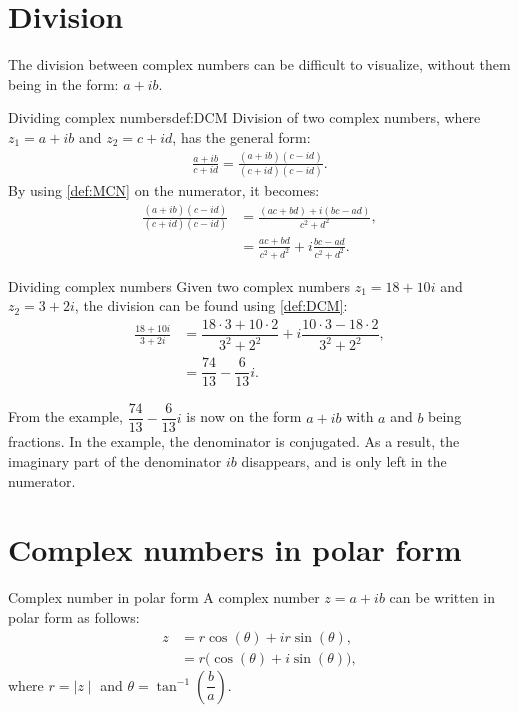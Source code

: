 \section{Division}
The division between complex numbers can be difficult to visualize, without them being in the form: $a + ib$. 
\begin{definition}{Dividing complex numbers}{def:DCM}
Division of two complex numbers, where $z_1=a+ib$ and $z_2=c+id$, has the general form:
\begin{align*}
\frac{a + ib}{c + id} = \frac{(a+ib)(c-id)}{(c+id)(c-id)}.
\end{align*}
By using \cref{def:MCN} on the numerator, it becomes:  
\begin{align*}
\frac{(a+ib)(c-id)}{(c+id)(c-id)} &= \frac{(ac+bd)+i(bc-ad)}{c^2+d^2},							\\[1em]
&= \frac{ac+bd}{c^2+d^2}+i \frac{bc-ad}{c^2+d^2}.				
\end{align*}
\end{definition}
\begin{example}{Dividing complex numbers}{}
Given two complex numbers $z_1=18+10i$ and $z_2=3+2i$, the division can be found using \cref{def:DCM}:
\begin{align*}
\frac{18 + 10i}{3 + 2i} &= \dfrac{18\cdot3+10\cdot2}{3^2+2^2}+i\dfrac{10\cdot3-18\cdot2}{3^2+2^2},
\\
&=\dfrac{74}{13}-\dfrac{6}{13}i.
\end{align*}
\end{example}


\noindent From the example, $\dfrac{74}{13} - \dfrac{6}{13}i$ is now on the form $a+ib$ with $a$ and $b$ being fractions. In the example, the denominator is conjugated. As a result, the imaginary part of the denominator $ib$ disappears, and is only left in the numerator. 


\section{Complex numbers in polar form}

\begin{definition}{Complex number in polar form}{}
A complex number $z=a+ib$ can be written in polar form as follows:
\begin{align*}
z&=r\cos(\theta)+ir\sin(\theta),
\\
&=r\big(\cos(\theta)+i\sin(\theta)\big),
\end{align*}
where $r=\mid z \mid$ and $\theta=\tan^{-1}\left(\dfrac{b}{a} \right).$
\end{definition}

